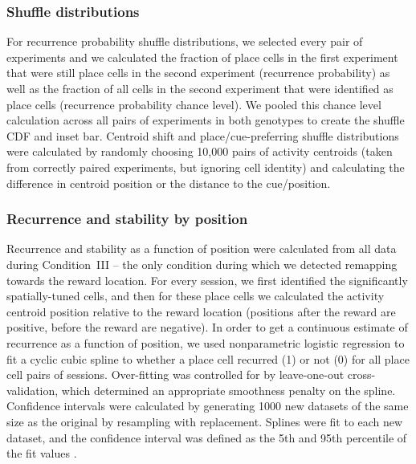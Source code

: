 \subsubsection{Shuffle distributions}
For recurrence probability shuffle distributions, we selected every pair of experiments and we calculated the fraction of place cells in the first experiment that were still place cells in the second experiment (recurrence probability) as well as the fraction of all cells in the second experiment that were identified as place cells (recurrence probability chance level). We pooled this chance level calculation across all pairs of experiments in both genotypes to create the shuffle CDF and inset bar. Centroid shift and place/cue-preferring shuffle distributions were calculated by randomly choosing 10,000 pairs of activity centroids (taken from correctly paired experiments, but ignoring cell identity) and calculating the difference in centroid position or the distance to the cue/position.

\subsubsection{Recurrence and stability by position}
\label{sec:df:methods:model}
Recurrence and stability as a function of position were calculated from all data during Condition~III -- the only condition during which we detected remapping towards the reward location. For every session, we first identified the significantly spatially-tuned cells, and then for these place cells we calculated the activity centroid position relative to the reward location (positions after the reward are positive, before the reward are negative). In order to get a continuous estimate of recurrence as a function of position, we used nonparametric logistic regression to fit a cyclic cubic spline to whether a place cell recurred (1) or not (0) for all place cell pairs of sessions. Over-fitting was controlled for by leave-one-out cross-validation, which determined an appropriate smoothness penalty on the spline. Confidence intervals were calculated by generating 1000 new datasets of the same size as the original by resampling with replacement. Splines were fit to each new dataset, and the confidence interval was defined as the 5th and 95th percentile of the fit values \citep{Wang1995, Hastie2009}.


